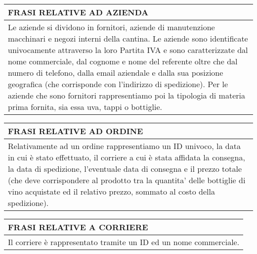 \begin{center}
	\begin{tabular}{P{16cm}}
		\toprule
		 \textbf {\large {FRASI RELATIVE AD AZIENDA}}                                                                                                                                                                                                                                                                                                                                                                                                                                                        \\
		\midrule
		Le aziende si dividono in fornitori, aziende di manutenzione macchinari e negozi interni della cantina. Le aziende sono identificate univocamente attraverso la loro Partita IVA e sono caratterizzate dal nome commerciale, dal cognome e nome del referente oltre che dal numero di telefono, dalla email aziendale e dalla sua posizione geografica (che corrisponde con l'indirizzo di spedizione). Per le aziende che sono fornitori rappresentiamo poi la tipologia di materia prima fornita, sia essa uva, tappi o bottiglie. \\
		\bottomrule
	\end{tabular}

	\vspace{0.5cm}

	\begin{tabular}{P{16cm}}
		\toprule
		 \textbf {\large {FRASI RELATIVE AD ORDINE}}                                                                                                                                                                                                                                                                                          \\
		\midrule
		Relativamente ad un ordine rappresentiamo un ID univoco, la data in cui è stato effettuato, il corriere a cui è stata affidata la consegna, la data di spedizione, l'eventuale data di consegna e il prezzo totale (che deve corrispondere al prodotto tra la quantita' delle bottiglie di vino acquistate ed il relativo prezzo, sommato al costo della spedizione). \\
		\bottomrule
	\end{tabular}

	\vspace{0.5cm}

	\begin{tabular}{P{16cm}}
		\toprule
		 \textbf {\large {FRASI RELATIVE A CORRIERE}} \\
		\midrule
		Il corriere è rappresentato tramite un ID ed un nome commerciale.             \\
		\bottomrule
	\end{tabular}


\end{center}
